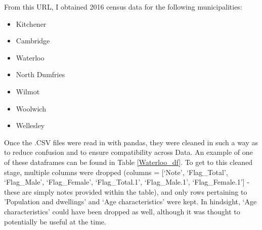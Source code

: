 \documentclass[10pt,a4paper]{report}
\begin{document}
	\noindent From this URL, I obtained 2016 census data for the following municipalities:
	\begin{itemize}
		\item Kitchener
		\item Cambridge
		\item Waterloo
		\item North Dumfries
		\item Wilmot
		\item Woolwich
		\item Wellesley
	\end{itemize}

	Once the .CSV files were read in with pandas, they were cleaned in such a way as to reduce confusion and to ensure compatibility across Data. An example of one of these dataframes can be found in Table \ref{Waterloo_df}. To get to this cleaned stage, multiple columns were dropped (columns = [`Note', `Flag\_Total', `Flag\_Male', `Flag\_Female', `Flag\_Total.1', `Flag\_Male.1', `Flag\_Female.1'] - these are simply notes provided within the table), and only rows pertaining to 'Population and dwellings' and `Age characteristics' were kept. In hindsight, `Age characteristics' could have been dropped as well, although it was thought to potentially be useful at the time.
	
	
	
\end{document}
